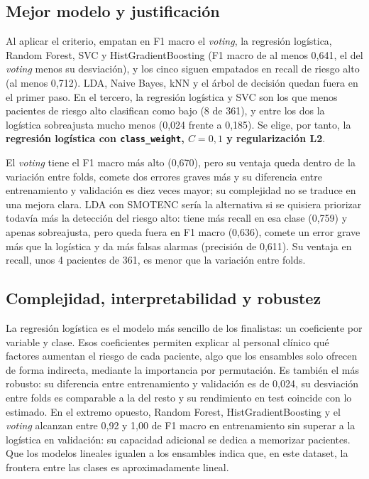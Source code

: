 \documentclass[journal,onecolumn]{IEEEtran}
\begin{document}
\subsection{Mejor modelo y justificación}\label{sec:mejor}
Al aplicar el criterio, empatan en F1 macro el \textit{voting}, la regresión logística, Random
Forest, SVC y HistGradientBoosting (F1 macro de al menos 0,641, el del \textit{voting} menos su
desviación), y los cinco siguen empatados en recall de riesgo alto (al menos 0,712).
LDA, Naive Bayes, kNN y el árbol de decisión quedan fuera en el primer paso.
En el tercero, la regresión logística y SVC son los que menos pacientes de riesgo alto clasifican como
bajo (8 de 361), y entre los dos la logística sobreajusta mucho menos (0,024 frente a 0,185).
Se elige, por tanto, la \textbf{regresión logística con \texttt{class\_weight}, $C = 0{,}1$ y
regularización L2}.

El \textit{voting} tiene el F1 macro más alto (0,670), pero su ventaja queda dentro de la variación
entre folds, comete dos errores graves más y su diferencia entre entrenamiento y validación es diez
veces mayor; su complejidad no se traduce en una mejora clara.
LDA con SMOTENC sería la alternativa si se quisiera priorizar todavía más la detección del riesgo
alto: tiene más recall en esa clase (0,759) y apenas sobreajusta, pero queda fuera en F1 macro
(0,636), comete un error grave más que la logística y da más falsas alarmas (precisión de 0,611).
Su ventaja en recall, unos 4 pacientes de 361, es menor que la variación entre folds.

\subsection{Complejidad, interpretabilidad y robustez}
La regresión logística es el modelo más sencillo de los finalistas: un coeficiente por variable y
clase.
Esos coeficientes permiten explicar al personal clínico qué factores aumentan el riesgo de cada
paciente, algo que los ensambles solo ofrecen de forma indirecta, mediante la importancia por
permutación.
Es también el más robusto: su diferencia entre entrenamiento y validación es de 0,024, su desviación
entre folds es comparable a la del resto y su rendimiento en test coincide con lo estimado.
En el extremo opuesto, Random Forest, HistGradientBoosting y el \textit{voting} alcanzan entre 0,92 y
1,00 de F1 macro en entrenamiento sin superar a la logística en validación: su capacidad adicional se
dedica a memorizar pacientes.
Que los modelos lineales igualen a los ensambles indica que, en este dataset, la frontera entre las
clases es aproximadamente lineal.
\end{document}
